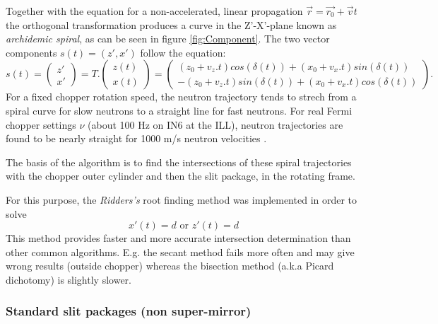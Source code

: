 Together with the equation for a non-accelerated, linear propagation $\vec{r} = \vec{r_0}+\vec{v}t$ the orthogonal transformation produces a curve in the Z'-X'-plane known as \emph{archidemic spiral}, as can be seen in figure \ref{fig:Component}. The two vector components $s(t) = (z',x')$ follow the equation:
\begin{equation}
s(t) = \left(
\begin{array}{c}
z' \\
x'
\end{array}
\right) = T.\left(
\begin{array}{c}
z(t) \\
x(t)
\end{array}
\right) = \left(
\begin{array}{c}
(z_0+v_z.t)cos(\delta(t)) + (x_0+v_x.t)sin(\delta(t)) \\
-(z_0+v_z.t)sin(\delta(t)) + (x_0+v_x.t)cos(\delta(t))
\end{array}
\right).
\label{eq:Txz}
\end{equation}
For a fixed chopper rotation speed, the neutron trajectory tends to strech from a spiral curve for slow neutrons to a straight line for fast neutrons. For real Fermi chopper settings $\nu$ (about 100 Hz on IN6 at the ILL), neutron trajectories are found to be nearly straight for 1000 m/s neutron velocities \cite{blanc83}.

The basis of the algorithm is to find the intersections of these spiral trajectories with the chopper outer cylinder and then the slit package, in the rotating frame.

For this purpose, the \emph{Ridders's} root finding method was implemented \cite{NumRecip} in order to solve
\begin{equation}
x'(t) = d \textrm{\ or\ } z'(t) = d
\label{eq:Ridder}
\end{equation}
This method provides faster and more accurate intersection determination than other common algorithms. E.g. the secant method fails more often and may give wrong results (outside chopper) whereas the bisection method (a.k.a Picard dichotomy) is slightly slower.

\subsubsection{Standard slit packages (non super-mirror)}

